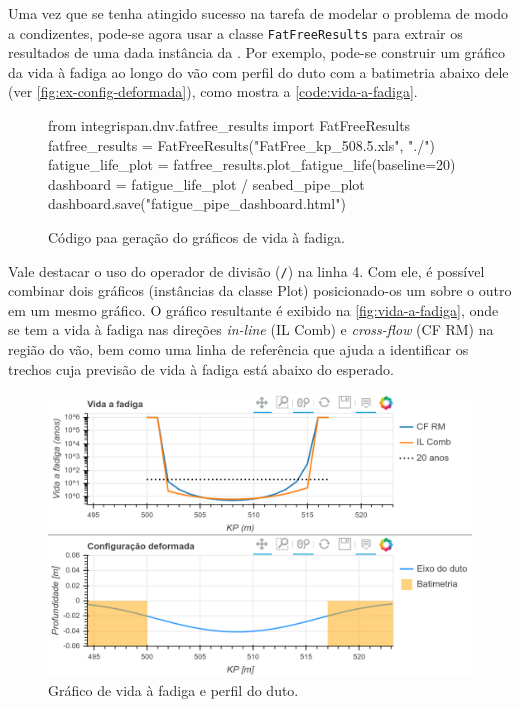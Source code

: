 Uma vez que se tenha atingido sucesso na tarefa de modelar o problema de modo a condizentes, pode-se agora usar a classe \texttt{FatFreeResults} para extrair os resultados de uma dada instância da \fatfree. Por exemplo, pode-se construir um gráfico da vida à fadiga ao longo do vão com perfil do duto com a batimetria abaixo dele (ver \autoref{fig:ex-config-deformada}), como mostra a \autoref{code:vida-a-fadiga}.

\begin{figure}[!ht] %
	\caption{Código paa geração do gráficos de vida à fadiga.}\label{code:vida-a-fadiga}
	\begin{pythoncode}
from integrispan.dnv.fatfree_results import FatFreeResults
fatfree_results = FatFreeResults("FatFree_kp_508.5.xls", "./")
fatigue_life_plot = fatfree_results.plot_fatigue_life(baseline=20)
dashboard = fatigue_life_plot / seabed_pipe_plot
dashboard.save("fatigue_pipe_dashboard.html")
	\end{pythoncode}
\end{figure}

Vale destacar o uso do operador de divisão (\texttt{/}) na linha 4. Com ele, é possível combinar dois gráficos (instâncias da classe Plot) posicionado-os um sobre o outro em um mesmo gráfico. O gráfico resultante é exibido na \autoref{fig:vida-a-fadiga}, onde se tem a vida à fadiga nas direções \textit{in-line} (IL Comb) e \textit{cross-flow} (CF RM) na região do vão, bem como uma linha de referência que ajuda a identificar os trechos cuja previsão de vida à fadiga está abaixo do esperado.

\begin{figure}[!ht]
	\centering
	\caption{Gráfico de vida à fadiga e perfil do duto.}\label{fig:vida-a-fadiga}
	\includegraphics[width=\textwidth]{imagens/exemplo/vida-a-fadiga}
\end{figure}


